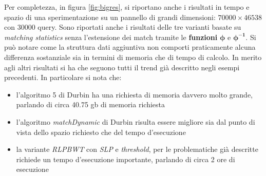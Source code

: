Per completezza, in figura \ref{fig:bigres}, si riportano anche i risultati in
tempo 
e spazio di una sperimentazione su un pannello di grandi dimensioni:
$70000\times 46538$ con $30000$ query. Sono riportati anche i risultati delle
tre varianti basate su \textit{matching statistics} senza l'estensione dei match
tramite le \textbf{funzioni} $\boldsymbol \phi$ e
$\boldsymbol\phi^{\mathbf{-1}}$. Si può notare come la struttura dati aggiuntiva
non comporti praticamente alcuna differenza sostanziale sia in termini di
memoria che di tempo di calcolo. In merito agli altri risultati si ha che
seguono tutti il trend già descritto negli esempi precedenti. In particolare si
nota che:
\begin{itemize}
  \item l'algoritmo 5 di Durbin ha una richiesta di memoria davvero molto
  grande, parlando di circa 40.75 gb di memoria richiesta
  \item l'algoritmo \textit{matchDynamic} di Durbin risulta essere migliore sia
  dal punto di vista dello spazio richiesto che del tempo d'esecuzione
  \item la variante \textit{RLPBWT} con \textit{SLP} e \textit{threshold}, per
  le problematiche già descritte richiede un tempo d'esecuzione importante,
  parlando di circa 2 ore di esecuzione
\end{itemize}
